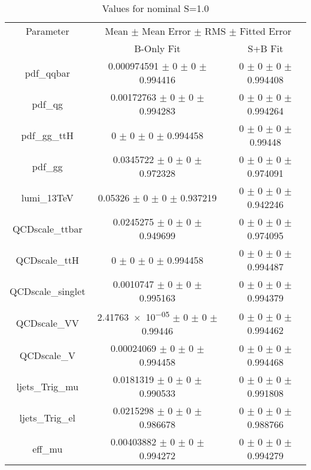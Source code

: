 \begin{table}
\centering
\caption{Values for nominal S=1.0}
\begin{tabular}{ccc}
\toprule
Parameter 	& \multicolumn{2}{c}{Mean $\pm$ Mean Error $\pm$ RMS $\pm$ Fitted Error}\\
 	& B-Only Fit & S+B Fit\\
\midrule
pdf\_qqbar 	& \num{0.000974591} $\pm$ \num{0} $\pm$ \num{0} $\pm$ \num{0.994416} 	& \num{0} $\pm$ \num{0} $\pm$ \num{0} $\pm$ \num{0.994408}\\
pdf\_qg 	& \num{0.00172763} $\pm$ \num{0} $\pm$ \num{0} $\pm$ \num{0.994283} 	& \num{0} $\pm$ \num{0} $\pm$ \num{0} $\pm$ \num{0.994264}\\
pdf\_gg\_ttH 	& \num{0} $\pm$ \num{0} $\pm$ \num{0} $\pm$ \num{0.994458} 	& \num{0} $\pm$ \num{0} $\pm$ \num{0} $\pm$ \num{0.99448}\\
pdf\_gg 	& \num{0.0345722} $\pm$ \num{0} $\pm$ \num{0} $\pm$ \num{0.972328} 	& \num{0} $\pm$ \num{0} $\pm$ \num{0} $\pm$ \num{0.974091}\\
lumi\_13TeV 	& \num{0.05326} $\pm$ \num{0} $\pm$ \num{0} $\pm$ \num{0.937219} 	& \num{0} $\pm$ \num{0} $\pm$ \num{0} $\pm$ \num{0.942246}\\
QCDscale\_ttbar 	& \num{0.0245275} $\pm$ \num{0} $\pm$ \num{0} $\pm$ \num{0.949699} 	& \num{0} $\pm$ \num{0} $\pm$ \num{0} $\pm$ \num{0.974095}\\
QCDscale\_ttH 	& \num{0} $\pm$ \num{0} $\pm$ \num{0} $\pm$ \num{0.994458} 	& \num{0} $\pm$ \num{0} $\pm$ \num{0} $\pm$ \num{0.994487}\\
QCDscale\_singlet 	& \num{0.0010747} $\pm$ \num{0} $\pm$ \num{0} $\pm$ \num{0.995163} 	& \num{0} $\pm$ \num{0} $\pm$ \num{0} $\pm$ \num{0.994379}\\
QCDscale\_VV 	& \num{2.41763e-05} $\pm$ \num{0} $\pm$ \num{0} $\pm$ \num{0.99446} 	& \num{0} $\pm$ \num{0} $\pm$ \num{0} $\pm$ \num{0.994462}\\
QCDscale\_V 	& \num{0.00024069} $\pm$ \num{0} $\pm$ \num{0} $\pm$ \num{0.994458} 	& \num{0} $\pm$ \num{0} $\pm$ \num{0} $\pm$ \num{0.994468}\\
ljets\_Trig\_mu 	& \num{0.0181319} $\pm$ \num{0} $\pm$ \num{0} $\pm$ \num{0.990533} 	& \num{0} $\pm$ \num{0} $\pm$ \num{0} $\pm$ \num{0.991808}\\
ljets\_Trig\_el 	& \num{0.0215298} $\pm$ \num{0} $\pm$ \num{0} $\pm$ \num{0.986678} 	& \num{0} $\pm$ \num{0} $\pm$ \num{0} $\pm$ \num{0.988766}\\
eff\_mu 	& \num{0.00403882} $\pm$ \num{0} $\pm$ \num{0} $\pm$ \num{0.994272} 	& \num{0} $\pm$ \num{0} $\pm$ \num{0} $\pm$ \num{0.994279}\\

\end{tabular}
\end{table}
